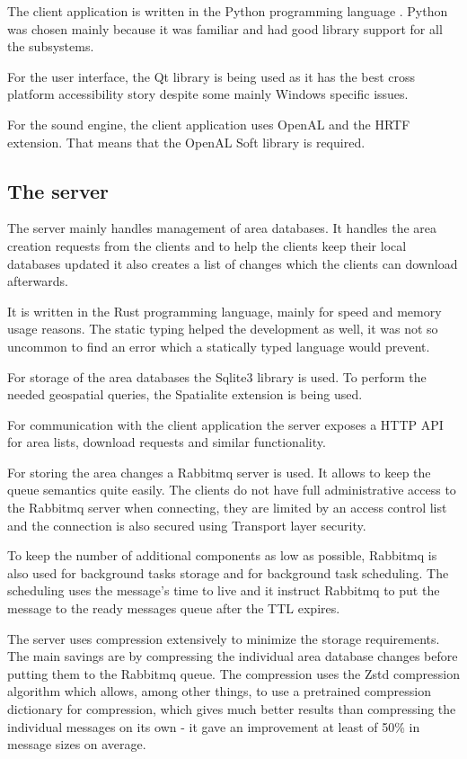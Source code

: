 \documentclass[nolof,digital]{fithesis3}
\begin{document}
The client application is written in the Python programming language \parencite{python}. Python was chosen mainly because it was familiar and had good library support for all the subsystems.

For the user interface, the Qt library \parencite{qt} is being used as it has the best cross platform accessibility story despite some mainly Windows specific issues.

For the sound engine, the client application uses OpenAL and the HRTF extension. That means that the OpenAL Soft library is required.
\subsection{The server}
The server mainly handles management of area databases. It handles the area creation requests from the clients and to help the clients keep their local databases updated it also creates a list of changes which the clients can download afterwards.

It is written in the Rust programming language, mainly for speed and memory usage reasons. The static typing helped the development as well, it was not so uncommon to find an error which a statically typed language would prevent.

For storage of the area databases the Sqlite3 library is used. To perform the needed geospatial queries, the Spatialite extension is being used.

For communication with the client application the server exposes a HTTP API for area lists, download requests and similar functionality. 

For storing the area changes a Rabbitmq server is used. It allows to keep the queue semantics quite easily. The clients do not have full administrative access to the Rabbitmq server when connecting, they are limited by an access control list and the connection is also secured using Transport layer security.

To keep the number of additional components as low as possible, Rabbitmq is also used for background tasks storage and for background task scheduling. The scheduling uses the message's time to live and it instruct Rabbitmq to put the message to the ready messages queue after the TTL expires.

The server uses compression extensively to minimize the storage requirements. The main savings are by compressing the individual area database changes before putting them to the Rabbitmq queue. The compression uses the Zstd compression algorithm which allows, among other things, to use a pretrained compression dictionary for compression, which gives much better results than compressing the individual messages on its own - it gave an improvement at least of 50\% in message sizes on average.
\end{document}
